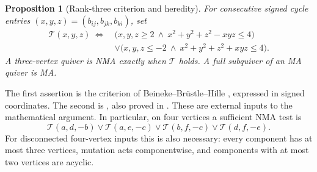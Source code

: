 \documentclass[11pt]{amsart}
\newtheorem{proposition}[theorem]{Proposition}
\theoremstyle{definition}\newtheorem{definition}[theorem]{Definition}
\theoremstyle{remark}\newtheorem{remark}[theorem]{Remark}
\begin{document}
\begin{proposition}[Rank-three criterion and heredity]\label{prop:rank3}
For consecutive signed cycle entries $(x,y,z)=(b_{ij},b_{jk},b_{ki})$, set
\begin{align*}
 \mathcal T(x,y,z)\ \Longleftrightarrow\ &
 \bigl(x,y,z\ge2\ \land\ x^2+y^2+z^2-xyz\le4\bigr)\\
 &\lor\bigl(x,y,z\le-2\ \land\ x^2+y^2+z^2+xyz\le4\bigr).
\end{align*}
A three-vertex quiver is NMA exactly when $\mathcal T$ holds. A full subquiver of an MA quiver is MA.
\end{proposition}
The first assertion is the criterion of Beineke--Br\"ustle--Hille \cite[Theorems~1.1--1.2]{BBH}, expressed in signed coordinates. The second is \cite[Corollary~5.3]{BMR}, also proved in \cite[Proposition~2.3]{Warkentin11}. These are external inputs to the mathematical argument. In particular, on four vertices a sufficient NMA test is
\begin{equation}\label{eq:triangles}
 \mathcal T(a,d,-b)\lor\mathcal T(a,e,-c)\lor
 \mathcal T(b,f,-c)\lor\mathcal T(d,f,-e).
\end{equation}
For disconnected four-vertex inputs this is also necessary: every component has at most three vertices, mutation acts componentwise, and components with at most two vertices are acyclic.
\end{document}
